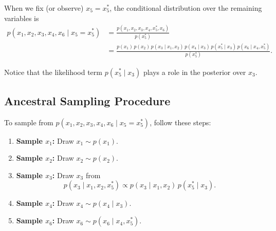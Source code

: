 \documentclass{article}
\begin{document}
When we fix (or observe) \( x_5 = x_5^* \), the conditional distribution over the remaining variables is
\begin{equation}
\begin{split}
    p(x_1,x_2,x_3,x_4,x_6 \mid x_5 = x_5^*) 
    &= \frac{p(x_1,x_2,x_3,x_4,x_5^*,x_6)}{p(x_5^*)} \\
    &= \frac{p(x_1)\,p(x_2)\,p(x_3\mid x_1,x_2)\,p(x_4\mid x_3)\,p(x_5^*\mid x_3)\,p(x_6\mid x_4,x_5^*)}{p(x_5^*)}.
\end{split}
\end{equation}

Notice that the likelihood term \( p(x_5^*\mid x_3) \) plays a role in the posterior over \( x_3 \).

\subsection*{Ancestral Sampling Procedure}

To sample from \( p(x_1,x_2,x_3,x_4,x_6 \mid x_5 = x_5^*) \), follow these steps:

\begin{enumerate}
    \item \textbf{Sample \(x_1\):} Draw \( x_1 \sim p(x_1) \).
    \item \textbf{Sample \(x_2\):} Draw \( x_2 \sim p(x_2) \).
    \item \textbf{Sample \(x_3\):} Draw \( x_3 \) from 
    \[
    p(x_3\mid x_1,x_2,x_5^*) \propto p(x_3\mid x_1,x_2)\,p(x_5^*\mid x_3).
    \]
    \item \textbf{Sample \(x_4\):} Draw \( x_4 \sim p(x_4\mid x_3) \).
    \item \textbf{Sample \(x_6\):} Draw \( x_6 \sim p(x_6\mid x_4,x_5^*) \).
\end{enumerate}




\end{document}
